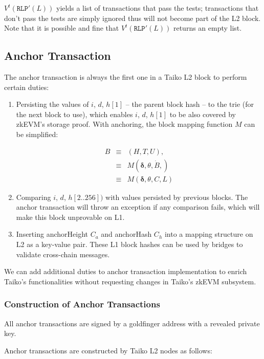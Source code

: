 \documentclass[9pt,oneside]{amsart}
\begin{document}
\begin{multicols}{2}
$V^t(\texttt{RLP}'(L))$ yields a list of transactions that pass the tests; transactions that don't pass the tests are simply ignored thus will not become part of the L2 block. Note that it is possible and fine that $V^t(\texttt{RLP}'(L))$ returns an empty list.


\subsection{Anchor Transaction} \label{sec:anchoring}

The anchor transaction is always the first one in a Taiko L2 block to perform certain duties:

\begin{enumerate}
\item Persisting the values of $i$, $d$, $h[1]$ -- the parent block hash -- to the trie (for the next block to use), which enables $i$, $d$, $h[1]$ to be also covered by  zkEVM's storage proof.   With anchoring, the block mapping function $M$  can be simplified:

\begin{eqnarray}
B & \equiv & (H, T, U), \\
\nonumber & \equiv &  M(\boldsymbol{\delta}, \theta, \dot{B}, )  \\
\nonumber & \equiv & M(\boldsymbol{\delta},  \theta, C, L)
\end{eqnarray}

\item Comparing $i$, $d$, $h[2..256])$ with values persisted by previous blocks. The anchor transaction will throw an exception if any comparison fails, which will make this block unprovable on L1.
\item Inserting anchorHeight $C_a$ and anchorHash $C_h$ into a mapping structure on L2 as a key-value pair. These L1 block hashes can be used by bridges to validate cross-chain messages.
\end{enumerate}

We can add additional duties to anchor transaction implementation to enrich Taiko's functionalities without requesting changes in Taiko's zkEVM subsystem.

\subsubsection{Construction of Anchor Transactions} All anchor transactions are signed by a goldfinger address with a revealed private key. 

Anchor transactions are constructed by Taiko L2 nodes as follows:


\end{multicols}
\end{document}
